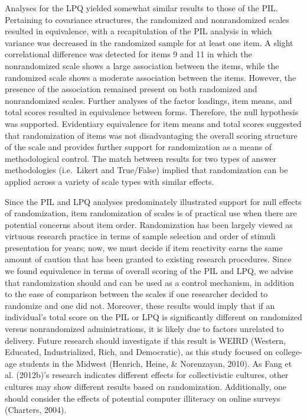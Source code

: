 \documentclass[english,man, mask]{apa6}
\theoremstyle{definition}
\theoremstyle{definition}
\theoremstyle{definition}
\theoremstyle{remark}
\begin{document}
Analyses for the LPQ yielded somewhat similar results to those of the
PIL. Pertaining to covariance structures, the randomized and
nonrandomized scales resulted in equivalence, with a recapitulation of
the PIL analysis in which variance was decreased in the randomized
sample for at least one item. A slight correlational difference was
detected for items 9 and 11 in which the nonrandomized scale shows a
large association between the items, while the randomized scale shows a
moderate association between the items. However, the presence of the
association remained present on both randomized and nonrandomized
scales. Further analyses of the factor loadings, item means, and total
scores resulted in equivalence between forms. Therefore, the null
hypothesis was supported. Evidentiary equivalence for item means and
total scores suggested that randomization of items was not
disadvantaging the overall scoring structure of the scale and provides
further support for randomization as a means of methodological control.
The match between results for two types of answer methodologies
(i.e.~Likert and True/False) implied that randomization can be applied
across a variety of scale types with similar effects.

Since the PIL and LPQ analyses predominately illustrated support for
null effects of randomization, item randomization of scales is of
practical use when there are potential concerns about item order.
Randomization has been largely viewed as virtuous research practice in
terms of sample selection and order of stimuli presentation for years;
now, we must decide if item reactivity earns the same amount of caution
that has been granted to existing research procedures. Since we found
equivalence in terms of overall scoring of the PIL and LPQ, we advise
that randomization should and can be used as a control mechanism, in
addition to the ease of comparison between the scales if one researcher
decided to randomize and one did not. Moreover, these results would
imply that if an individual's total score on the PIL or LPQ is
significantly different on randomized versus nonrandomized
administrations, it is likely due to factors unrelated to delivery.
Future research should investigate if this result is WEIRD (Western,
Educated, Industrialized, Rich, and Democratic), as this study focused
on college-age students in the Midwest (Henrich, Heine, \& Norenzayan,
2010). As Fang et al. (2012b)'s research indicates different effects for
collectivistic cultures, other cultures may show different results based
on randomization. Additionally, one should consider the effects of
potential computer illiteracy on online surveys (Charters, 2004).
\end{document}
